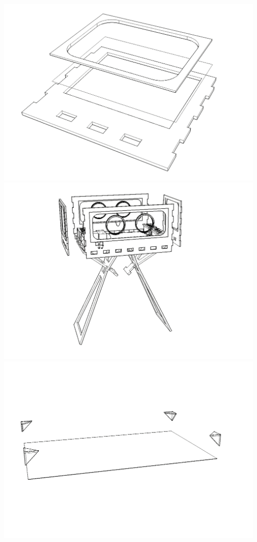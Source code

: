 \documentclass{article}
\begin{document}
\begin{center}
	\includegraphics[width=\hsize]{assembling/step12.png}
	\includegraphics[width=\hsize]{assembling/step13.png}
	\includegraphics[width=\hsize]{assembling/step14.png}

\end{center}
\end{document}
